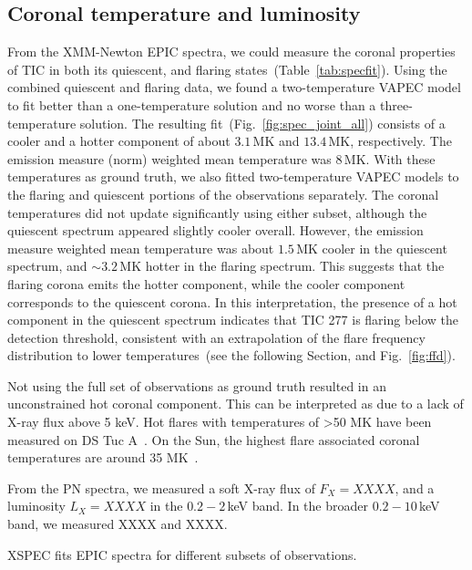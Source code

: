 \documentclass[twocolumn]{aastex631}
\begin{document}
\subsection{Coronal temperature and luminosity}
\label{sec:res:XrayTL}

From the XMM-Newton EPIC spectra, we could measure the coronal properties of TIC in both its quiescent, and flaring states~(Table~\ref{tab:specfit}). Using the combined quiescent and flaring data, we found a two-temperature VAPEC model to fit better than a one-temperature solution and no worse than a three-temperature solution. The resulting fit~(Fig.~\ref{fig:spec_joint_all}) consists of a cooler and a hotter component of about $3.1\,$MK and $13.4\,$MK, respectively. The emission measure (norm) weighted mean temperature was $8\,$MK. With these temperatures as ground truth, we also fitted two-temperature VAPEC models to the flaring and quiescent portions of the observations separately. The coronal temperatures did not update significantly using either subset, although the quiescent spectrum appeared slightly cooler overall. However, the emission measure weighted mean temperature was about $1.5\,$MK cooler in the quiescent spectrum, and $\sim3.2\,$MK hotter in the flaring spectrum. This suggests that the flaring corona emits the hotter component, while the cooler component corresponds to the quiescent corona. In this interpretation, the presence of a hot component in the quiescent spectrum indicates that TIC 277 is flaring below the detection threshold, consistent with an extrapolation of the flare frequency distribution to lower temperatures~(see the following Section, and Fig.~\ref{fig:ffd}). 

Not using the full set of observations as ground truth resulted in an unconstrained hot coronal component. This can be interpreted as due to a lack of X-ray flux above 5 keV. Hot flares with temperatures of >50 MK have been measured on DS Tuc A~\citep{pillitteri2011xray}. On the Sun, the highest flare associated coronal temperatures are around 35 MK~\citep{kay2003soft}.

From the PN spectra, we measured a soft X-ray flux of $F_X=XXXX$, and a luminosity $L_X=XXXX$ in the $0.2-2\,$keV band. In the broader $0.2-10\,$keV band, we measured XXXX and XXXX.
 \begin{table}
\centering
    \caption{XSPEC fits EPIC spectra for different subsets of observations.}
    
        \label{tab:specfit}
\end{table}
\end{document}
